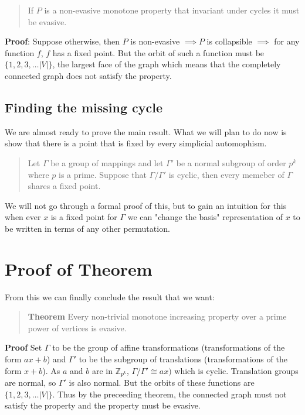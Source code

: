 \documentclass[a4paper]{article}
\begin{document}
\begin{quote}
    If $P$ is a non-evasive monotone property that invariant under cycles it must be evasive.
\end{quote}

\textbf{Proof}: Suppose otherwise, then $P$ is non-evasive $\implies P$ is collapsible $\implies$ for any function $f$, $f$ has a fixed point. But the orbit of such a function must be $\{1, 2, 3, \ldots |V| \}$, the largest face of the graph which means that the completely connected graph does not satisfy the property.

\subsection{Finding the missing cycle}

We are almost ready to prove the main result. What we will plan to do now is show that there is a point that is fixed by every simplicial automophism.

\begin{quote}
    Let $\Gamma$ be a group of mappings and let $\Gamma'$ be a normal subgroup of order $p^k$ where $p$ is a prime. Suppose that $\Gamma/\Gamma'$ is cyclic, then every memeber of $\Gamma$ shares a fixed point.
\end{quote}

We will not go through a formal proof of this, but to gain an intuition for this when ever $x$ is a fixed point for $\Gamma$ we can "change the basis" representation of $x$ to be written in terms of any other permutation.

\section{Proof of Theorem}

From this we can finally conclude the result that we want:

\begin{quote}
    \textbf{Theorem} Every non-trivial monotone increasing property over a prime power of vertices is evasive.
\end{quote}

\textbf{Proof} Set $\Gamma$ to be the group of affine transformations (transformations of the form $ax + b$) and $\Gamma'$ to be the subgroup of translations (transformations of the form $x + b$). As $a$ and $b$ are in $\mathbb{Z}_{p^k}$, $\Gamma/\Gamma' \cong ax)$ which is cyclic. Translation groups are normal, so $\Gamma'$ is also normal. But the orbits of these functions are $\{ 1, 2, 3, \ldots |V| \}$. Thus by the preceeding theorem, the connected graph must not satisfy the property and the property must be evasive.
\end{document}
